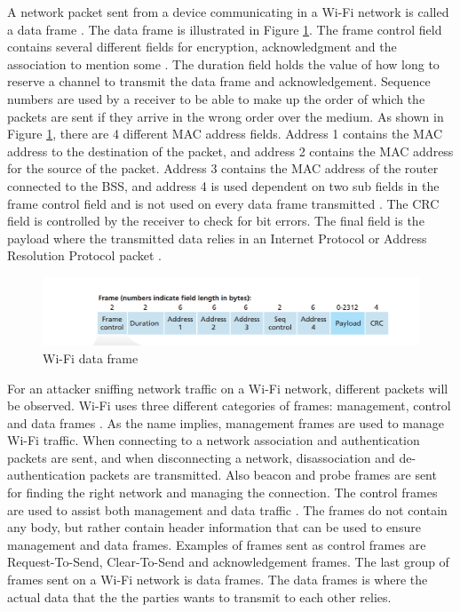 A network packet sent from a device communicating in a \gls{Wi-Fi} network is called a data frame \cite{Datacom}. The data frame is illustrated in Figure \ref{fig:WiFiDataframe}. The frame control field contains several different fields for encryption, acknowledgment and the association to mention some \cite{Datacom}. The duration field holds the value of how long to reserve a channel to transmit the data frame and acknowledgement. Sequence numbers are used by a receiver to be able to make up the order of which the packets are sent if they arrive in the wrong order over the medium. As shown in Figure \ref{fig:WiFiDataframe}, there are 4 different \gls{MAC} address fields. Address 1 contains the \gls{MAC} address to the destination of the packet, and address 2 contains the \gls{MAC} address for the source of the packet. Address 3 contains the \gls{MAC} address of the router connected to the \gls{BSS}, and address 4 is used dependent on two sub fields in the frame control field and is not used on every data frame transmitted \cite{WifiStandard}. The \gls{CRC} field is controlled by the receiver to check for bit errors. The final field is the payload where the transmitted data relies in an Internet Protocol or Address Resolution Protocol packet \cite{Datacom}. 

\begin{figure} [!h]
    \includegraphics[width=1\textwidth]{figures/WifiDataFrame.png}
    \caption{\gls{Wi-Fi} data frame \cite{Datacom}}
    \centering
    \label{fig:WiFiDataframe}
\end{figure}

For an attacker sniffing network traffic on a \gls{Wi-Fi} network, different packets will be observed. \gls{Wi-Fi} uses three different categories of frames: management, control and data frames \cite{WiFiFrameMGMT}. As the name implies, management frames are used to manage \gls{Wi-Fi} traffic. When connecting to a network association and authentication packets are sent, and when disconnecting a network, disassociation and de-authentication packets are transmitted. Also beacon and probe frames are sent for finding the right network and managing the connection. The control frames are used to assist both management and data traffic \cite{WiFiFrames}. The frames do not contain any body, but rather contain header information that can be used to ensure management and data frames. Examples of frames sent as control frames are Request-To-Send, Clear-To-Send and acknowledgement frames. The last group of frames sent on a \gls{Wi-Fi} network is data frames. The data frames is where the actual data that the the parties wants to transmit to each other relies. 

